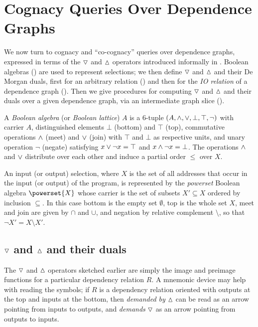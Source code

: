\section{Cognacy Queries Over Dependence Graphs}
\label{sec:conjugate}

We now turn to cognacy and ``co-cognacy'' queries over dependence graphs, expressed in terms of the
$\triangledown$ and $\demandedByR$ operators introduced informally in . Boolean algebras
() are used to represent selections; we then define $\triangledown$ and
$\demandedByR$ and their De Morgan duals, first for an arbitrary relation ()
and then for the \emph{IO relation} of a dependence graph ().
Then we give procedures for computing $\triangledown$ and $\demandedByR$ and their duals over a given dependence
graph, via an intermediate graph slice ().

\begin{definition}
\label{def:conjugate:Boolean-algebra}
A \emph{Boolean algebra} (or \emph{Boolean lattice}) $A$ is a 6-tuple $(A, \wedge, \vee, \bot, \top, \neg)$
with carrier $A$, distinguished elements $\bot$ (bottom) and $\top$ (top), commutative operations $\wedge$
(meet) and $\vee$ (join) with $\top$ and $\bot$ as respective units, and unary operation $\neg$ (negate)
satisfying $x \vee \neg x = \top$ and $x \wedge \neg x = \bot$. The operations $\wedge$ and $\vee$ distribute
over each other and induce a partial order $\leq$ over $X$.
\end{definition}

An input (or output) selection, where $X$ is the set of all addresses that occur in the input (or output) of
the program, is represented by the \emph{powerset} Boolean algebra $\powerset{X}$ whose carrier is the set of
subsets $X' \subseteq X$ ordered by inclusion $\subseteq$. In this case bottom is the empty set $\emptyset$,
top is the whole set $X$, meet and join are given by $\cap$ and $\cup$, and negation by relative complement
$\setminus$, so that $\neg X' = X \setminus X'$.

\subsection{$\triangledown$ and $\demandedByR$ and their duals}
\label{sec:conjugate:image-preimage}

The $\triangledown$ and $\demandedByR$ operators sketched earlier are simply the image and preimage functions for
a particular dependency relation $R$. A mnemonic device may help with reading the symbols; if $R$ is a
dependency relation oriented with outputs at the top and inputs at the bottom, then \emph{demanded by}
$\demandedByR$ can be read as an arrow pointing from inputs to outputs, and \emph{demands} $\triangledown$ as an
arrow pointing from outputs to inputs.

